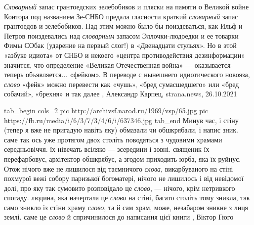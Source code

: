 \emph{Словарный} запас грантоедских зелебобиков и пляски на памяти о Великой войне
Контора под названием Зе-СНБО предала гласности краткий \emph{словарный} запас
грантоедов и зелебобиков. Над этим можно было бы поиздеваться, как Ильф и
Петров поиздевались над \emph{словарным} запасом Эллочки-людоедки и ее товарки Фимы
СОбак (ударение на первый слог!) в «Двенадцати стульях». Но в этой «азбуке
идиота» от СНБО и некоего «центра противодействия дезинформации» значится, что
определение «Великая Отечественная война» — оказывается- теперь объявляется...
«фейком». В переводе с нынешнего идиотического новояза, \emph{слово} «фейк» можно
перевести как «чушь», «бред сумасшедшего» или «бред собачий», «брехня» и так
далее
, 
Александр Карпец, strana.news, 26.10.2021


\ifcmt
  tab_begin cols=2
     pic http://archivsf.narod.ru/1969/vsp/65.jpg
     pic https://fb.ru/media/i/6/3/7/3/4/6/i/637346.jpg
  tab_end
\fi
Минув час, і стіну (тепер я вже не пригадую навіть яку) обмазали чи обшкрябали,
і напис зник. саме так ось уже протягом двох століть поводяться з чудовими
храмами середньовіччя. їх нівечать всіляко — зсередини і зовні.  священик їх
перефарбовує, архітектор обшкрябує, а згодом приходить юрба, яка їх руйнує.
Отож нічого вже не лишилося від таємничого \emph{слова}, викарбуваного на стіні
похмурої вежі собору паризької богоматері, нічого не лишилось і від невідомої
долі, про яку так сумовито розповідало це \emph{слово}, — нічого, крім
нетривкого спогаду. людина, яка начертала це \emph{слово} на стіні, багато
століть тому зникла, так само зникло із стіни храму \emph{слово}, та й сам
храм, може, незабаром зникне з лиця землі. саме це \emph{слово} й спричинилося
до написання цієї книги
, Віктор Гюго
